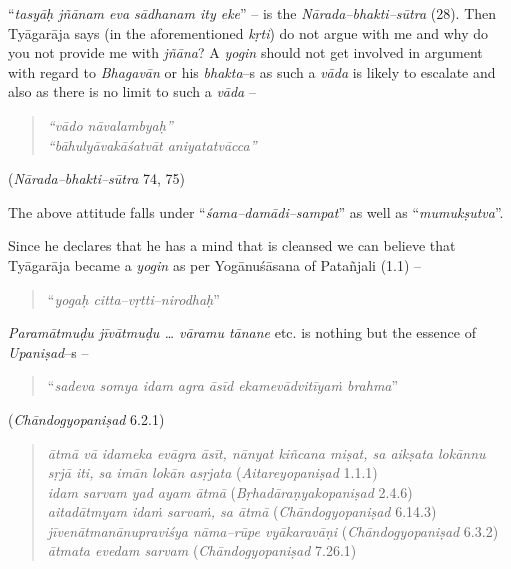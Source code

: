 “\textit{tasyāḥ jñānam eva sādhanam ity eke}” – is the \textit{Nārada–bhakti–sūtra} (28). Then Tyāgarāja says (in the aforementioned \textit{kṛti}) do not argue with me and why do you not provide me with \textit{jñāna}? A \textit{yogin} should not get involved in argument with regard to \textit{Bhagavān} or his \textit{bhakta}–s as such a \textit{vāda} is likely to escalate and also as there is no limit to such a \textit{vāda} –

\begin{verse}
\textit{“vādo nāvalambyaḥ”}\\\textit{“bāhulyāvakāśatvāt aniyatatvācca”}
\end{verse}

\begin{flushright}
(\textit{Nārada–bhakti–sūtra} 74, 75)
\end{flushright}

The above attitude falls under “\textit{śama–damādi–sampat}” as well as “\textit{mumukṣutva}”.

Since he declares that he has a mind that is cleansed we can believe that Tyāgarāja became a \textit{yogin} as per Yogānuśāsana of Patañjali (1.1) –

\begin{verse}
“\textit{yogaḥ citta–vṛtti–nirodhaḥ}”
\end{verse}

\textit{Paramātmuḍu jīvātmuḍu … vāramu tānane} etc. is nothing but the essence of \textit{Upaniṣad}–s –

\begin{verse}
“\textit{sadeva somya idam agra āsīd ekamevādvitīyaṁ brahma}”
\end{verse}

\begin{flushright}
(\textit{Chāndogyopaniṣad} 6.2.1)
\end{flushright}

\begin{verse}
\textit{ātmā vā idameka evāgra āsīt, nānyat kiñcana miṣat, sa aikṣata lokānnu}\\\textit{sṛjā iti, sa imān lokān asṛjata} (\textit{Aitareyopaniṣad} 1.1.1)\\\textit{idam sarvam yad ayam ātmā} (\textit{Bṛhadāraṇyakopaniṣad} 2.4.6)\\\textit{aitadātmyam idaṁ sarvaṁ, sa ātmā} (\textit{Chāndogyopaniṣad} 6.14.3)\\\textit{jīvenātmanānupraviśya nāma–rūpe vyākaravāṇi} (\textit{Chāndogyopaniṣad} 6.3.2)\\\textit{ātmata evedam sarvam} (\textit{Chāndogyopaniṣad} 7.26.1)
\end{verse}



